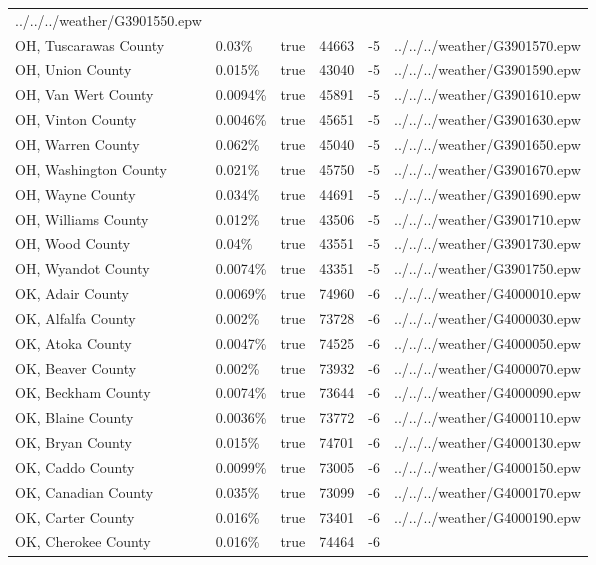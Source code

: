\begin{longtable}[]{@{}llllll@{}}
../../../weather/G3901550.epw \\
OH, Tuscarawas County & 0.03\% & true & 44663 & -5 &
../../../weather/G3901570.epw \\
OH, Union County & 0.015\% & true & 43040 & -5 &
../../../weather/G3901590.epw \\
OH, Van Wert County & 0.0094\% & true & 45891 & -5 &
../../../weather/G3901610.epw \\
OH, Vinton County & 0.0046\% & true & 45651 & -5 &
../../../weather/G3901630.epw \\
OH, Warren County & 0.062\% & true & 45040 & -5 &
../../../weather/G3901650.epw \\
OH, Washington County & 0.021\% & true & 45750 & -5 &
../../../weather/G3901670.epw \\
OH, Wayne County & 0.034\% & true & 44691 & -5 &
../../../weather/G3901690.epw \\
OH, Williams County & 0.012\% & true & 43506 & -5 &
../../../weather/G3901710.epw \\
OH, Wood County & 0.04\% & true & 43551 & -5 &
../../../weather/G3901730.epw \\
OH, Wyandot County & 0.0074\% & true & 43351 & -5 &
../../../weather/G3901750.epw \\
OK, Adair County & 0.0069\% & true & 74960 & -6 &
../../../weather/G4000010.epw \\
OK, Alfalfa County & 0.002\% & true & 73728 & -6 &
../../../weather/G4000030.epw \\
OK, Atoka County & 0.0047\% & true & 74525 & -6 &
../../../weather/G4000050.epw \\
OK, Beaver County & 0.002\% & true & 73932 & -6 &
../../../weather/G4000070.epw \\
OK, Beckham County & 0.0074\% & true & 73644 & -6 &
../../../weather/G4000090.epw \\
OK, Blaine County & 0.0036\% & true & 73772 & -6 &
../../../weather/G4000110.epw \\
OK, Bryan County & 0.015\% & true & 74701 & -6 &
../../../weather/G4000130.epw \\
OK, Caddo County & 0.0099\% & true & 73005 & -6 &
../../../weather/G4000150.epw \\
OK, Canadian County & 0.035\% & true & 73099 & -6 &
../../../weather/G4000170.epw \\
OK, Carter County & 0.016\% & true & 73401 & -6 &
../../../weather/G4000190.epw \\
OK, Cherokee County & 0.016\% & true & 74464 & -6 &

\end{longtable}
